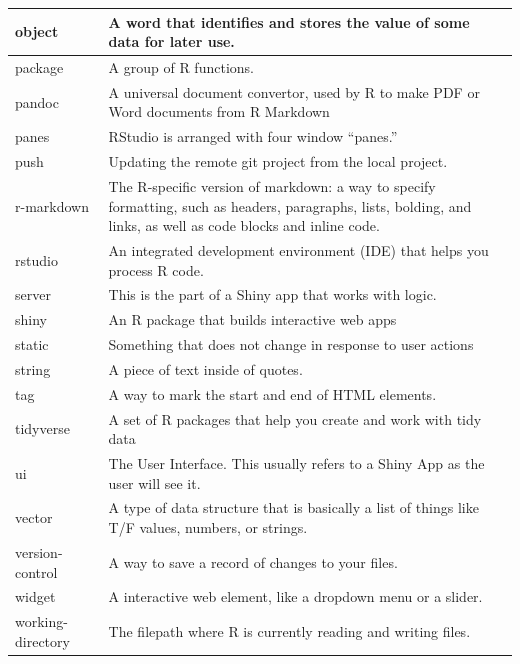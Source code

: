 \documentclass[
]{book}
\begin{document}
\begin{tabular}{l|l}
\hline
object & A word that identifies and stores the value of some data for later use.\\
\hline
package & A group of R functions.\\
\hline
pandoc & A universal document convertor, used by R to make PDF or Word documents from R Markdown\\
\hline
panes & RStudio is arranged with four window “panes.”\\
\hline
push & Updating the remote git project from the local project.\\
\hline
r-markdown & The R-specific version of markdown: a way to specify formatting, such as headers, paragraphs, lists, bolding, and links, as well as code blocks and inline code.\\
\hline
rstudio & An integrated development environment (IDE) that helps you process R code.\\
\hline
server & This is the part of a Shiny app that works with logic.\\
\hline
shiny & An R package that builds interactive web apps\\
\hline
static & Something that does not change in response to user actions\\
\hline
string & A piece of text inside of quotes.\\
\hline
tag & A way to mark the start and end of HTML elements.\\
\hline
tidyverse & A set of R packages that help you create and work with tidy data\\
\hline
ui & The User Interface. This usually refers to a Shiny App as the user will see it.\\
\hline
vector & A type of data structure that is basically a list of things like T/F values, numbers, or strings.\\
\hline
version-control & A way to save a record of changes to your files.\\
\hline
widget & A interactive web element, like a dropdown menu or a slider.\\
\hline
working-directory & The filepath where R is currently reading and writing files.\\
\hline
\end{tabular}

  
\end{document}
